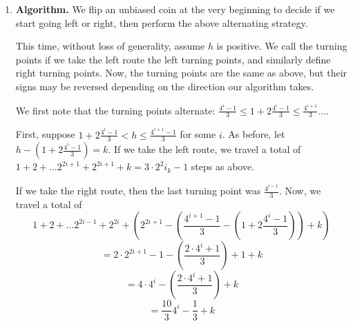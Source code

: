 \documentclass{article}
\newcommand{\E}[1]{\operatorname{E}\left[#1\right]}
\begin{document}
\begin{enumerate}
      First, suppose $2^i$ is a turning point. ALG will travel to $2^i$, then to $-2^{i+1}$, and then return and reach $h$. The cost of this is 
      $$2(1 + 2 + ... + 2^i + 2^{i+1}) + 2^i +k  = 2(2^{k+2}-1) + 2^i + k = 9 \cdot 2^i + k-2.$$

      Now suppose $-2^i$ is a turning point. ALG will travel to $2^{i-1}$, $-2^i$, and then will try to travel to $2^{i+1}$ and will find $h$ along the way. The total cost of this is  
      $$2(1 + 2 + ... + 2^{i-1} + 2^{i}) + 2^i +k  = 2(2^{k+1}-1) + 2^i + k = 5 \cdot 2^i + k-2.$$   
      
Averaging, we see that the expected cost of ALG is 
$$ \E{cost(ALG)} = \frac12 \left(  9 \cdot 2^i + k -2\right) + \frac12\left(5 \cdot 2^i + k-2\right) = 7 \cdot 2^i + k-2$$

Comparing this to the cost of OPT, we find that ALG is 7-competitive: 
$$\frac{\E{cost(ALG)}}{cost(OPT)} = \frac{7 \cdot 2^i + k-2}{  2^i + k} \leq \frac{7 \cdot 2^i +7k}{  2^i + k}  = 7.$$
      
      
      \iffalse
      
    \item
      \textbf{Algorithm.} We flip an unbiased coin at the very beginning to decide if we start going left or
      right, then perform the above alternating strategy.

      \vspace{2mm}
      This time, without loss of generality, assume $h$ is positive.
      We call the turning points if we take the left route the left turning
      points, and similarly define right turning points.  Now, the turning
      points are the same as above, but their signs may be reversed depending
      on the direction our algorithm takes.

        \vspace{2mm}
      We first note that the turning points alternate:
      $\frac{4^i - 1}{3} \leq 1 + 2\frac{4^i -1}{3} \leq \frac{4^{i+1}}{3}
      \ldots$.

    \vspace{2mm}
      First, suppose $1 + 2\frac{4^i -1}{3} < h \leq \frac{4^{i+1} -1}{3}$ for some $i$.
      As before, let $h - (1 + 2\frac{4^i -1}{3}) = k$. If we take the left route, we travel a total of
      $1 + 2 + \ldots 2^{2i+1} + 2^{2i+1} + k = 3 \cdot 2^2i _ k -1$ steps as above.

    \vspace{2mm}
      If we take the right route, then the last turning point was
      $\frac{4^{i-1}}{3}$. Now, we travel a total of
      $$1 + 2 + \ldots 2^{2i-1} + 2^{2i} + \left(2^{2i+1}-\left(\frac{4^{i+1} -1}{3} -
      \left(1 + 2\frac{4^i - 1}{3}\right)\right) + k\right)$$
      $$ = 2 \cdot 2^{2i+1} - 1  - \left( \frac{2 \cdot 4^i+ 1}{3}\right) +  1 + k$$
      $$ = 4 \cdot 4^i -  \left( \frac{2 \cdot 4^i+ 1}{3}\right) + k$$ 
      $$ = \frac{10}{3} 4^i - \frac{1}{3} + k$$



\end{enumerate}
\end{document}
